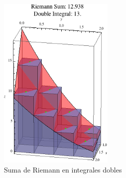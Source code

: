\begin{figure}[h]
\centering
\includegraphics[width=5.5cm]{./extra/Riemann_double_integral.png}
\caption{Suma de Riemann en integrales dobles}
\label{fig:chaper01_01_Riemann_double_integral}
\end{figure}